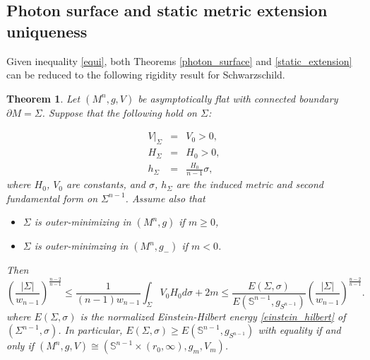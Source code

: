 \documentclass[12pt,twoside]{article}
\theoremstyle{plain}
\newtheorem{theorem}{Theorem}[section]
\theoremstyle{definition}
\theoremstyle{remark}
\numberwithin{equation}{section}
\begin{document}
\subsection{Photon surface and static metric extension uniqueness}
Given inequality \eqref{equi}, both Theorems \ref{photon_surface} and \ref{static_extension} can be reduced to the following rigidity result for Schwarzschild.
\begin{theorem} \label{general_rig}
Let $(M^{n},g,V)$ be asymptotically flat with connected boundary $\partial M = \Sigma$. Suppose that the following hold on $\Sigma$:

\begin{eqnarray}
    V|_{\Sigma} &=& V_{0} > 0, \label{V_const} \\
    H_{\Sigma} &=& H_{0} > 0, \label{H_const} \\
    h_{\Sigma} &=& \frac{H_{0}}{n-1} \sigma, \label{pure_trace}
\end{eqnarray}
where $H_{0}$, $V_{0}$ are constants, and $\sigma$, $h_{\Sigma}$ are the induced metric and second fundamental form on $\Sigma^{n-1}$. Assume also that

\begin{itemize}
\item $\Sigma$ is outer-minimizing in $(M^{n},g)$ if $m \geq 0$,
\item $\Sigma$ is outer-minimzing in $(M^{n},g_{-})$ if $m<0$.
\end{itemize}
Then 
\begin{equation*}
\left( \frac{|\Sigma|}{w_{n-1}} \right)^{\frac{n-2}{n-1}} \leq \frac{1}{(n-1)w_{n-1}} \int_{\Sigma} V_{0}H_{0} d\sigma + 2m \leq \frac{E(\Sigma,\sigma)}{E(\mathbb{S}^{n-1},g_{S^{n-1}})} \left( \frac{|\Sigma|}{w_{n-1}} \right)^{\frac{n-2}{n-1}}.
\end{equation*}
where $E(\Sigma,\sigma)$ is the normalized Einstein-Hilbert energy \eqref{einstein_hilbert} of $(\Sigma^{n-1},\sigma)$. In particular, $E(\Sigma,\sigma) \geq E(\mathbb{S}^{n-1},g_{S^{n-1}})$ with equality if and only if $(M^{n},g,V) \cong (\mathbb{S}^{n-1} \times (r_{0},\infty), g_{m}, V_{m})$.
\end{theorem}
\end{document}
